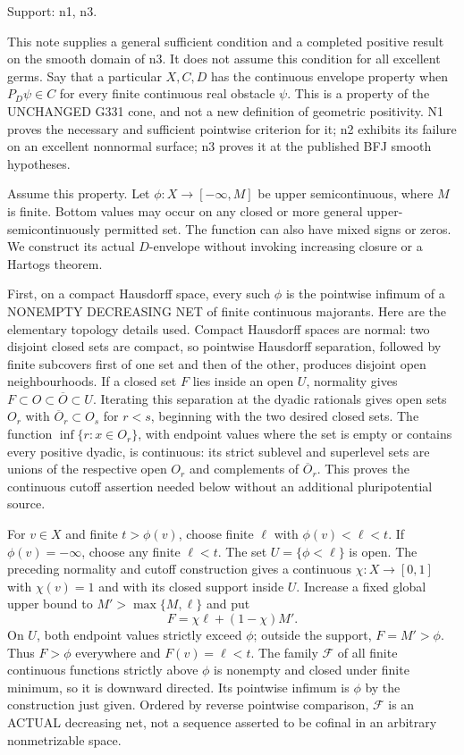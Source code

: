\documentclass[11pt]{article}
\begin{document}
Support: n1, n3.

This note supplies a general sufficient condition and a completed positive result on the smooth domain of n3. It does not assume this condition for all excellent germs. Say that a particular \(X,C,D\) has the continuous envelope property when \(P_D\psi\in C\) for every finite continuous real obstacle \(\psi\). This is a property of the UNCHANGED G331 cone, and not a new definition of geometric positivity. N1 proves the necessary and sufficient pointwise criterion for it; n2 exhibits its failure on an excellent nonnormal surface; n3 proves it at the published BFJ smooth hypotheses.

Assume this property. Let \(\phi:X\to[-\infty,M]\) be upper semicontinuous, where \(M\) is finite. Bottom values may occur on any closed or more general upper-semicontinuously permitted set. The function can also have mixed signs or zeros. We construct its actual \(D\)-envelope without invoking increasing closure or a Hartogs theorem.

First, on a compact Hausdorff space, every such \(\phi\) is the pointwise infimum of a NONEMPTY DECREASING NET of finite continuous majorants. Here are the elementary topology details used. Compact Hausdorff spaces are normal: two disjoint closed sets are compact, so pointwise Hausdorff separation, followed by finite subcovers first of one set and then of the other, produces disjoint open neighbourhoods. If a closed set \(F\) lies inside an open \(U\), normality gives \(F\subset O\subset\overline O\subset U\). Iterating this separation at the dyadic rationals gives open sets \(O_r\) with \(\overline O_r\subset O_s\) for \(r<s\), beginning with the two desired closed sets. The function \(\inf\{r:x\in O_r\}\), with endpoint values where the set is empty or contains every positive dyadic, is continuous: its strict sublevel and superlevel sets are unions of the respective open \(O_r\) and complements of \(\overline O_r\). This proves the continuous cutoff assertion needed below without an additional pluripotential source.

For \(v\in X\) and finite \(t>\phi(v)\), choose finite \(\ell\) with \(\phi(v)<\ell<t\). If \(\phi(v)=-\infty\), choose any finite \(\ell<t\). The set \(U=\{\phi<\ell\}\) is open. The preceding normality and cutoff construction gives a continuous \(\chi:X\to[0,1]\) with \(\chi(v)=1\) and with its closed support inside \(U\). Increase a fixed global upper bound to \(M'>\max\{M,\ell\}\) and put
\[
F=\chi\ell+(1-\chi)M'.
\]
On \(U\), both endpoint values strictly exceed \(\phi\); outside the support, \(F=M'>\phi\). Thus \(F>\phi\) everywhere and \(F(v)=\ell<t\). The family \(\mathcal F\) of all finite continuous functions strictly above \(\phi\) is nonempty and closed under finite minimum, so it is downward directed. Its pointwise infimum is \(\phi\) by the construction just given. Ordered by reverse pointwise comparison, \(\mathcal F\) is an ACTUAL decreasing net, not a sequence asserted to be cofinal in an arbitrary nonmetrizable space.
\end{document}
